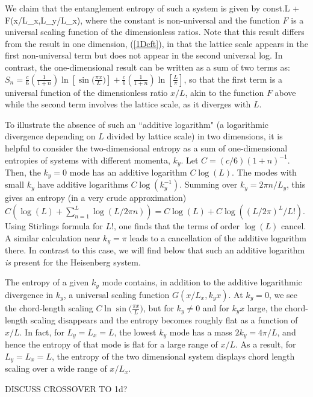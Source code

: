 \documentclass[prl,aps,twocolumn,floatfix,amsmath,amssymb,superscriptaddress,tightenlines]{revtex4}
\begin{document}
We claim that the entanglement entropy of such a system is given by
\be
{\rm const.}\times L + F(x/L_x,L_y/L_x),
\ee
where the constant is non-universal and the function $F$ is a universal scaling function of the dimensionless ratios.  Note that this result differs
from the result in one dimension, (\ref{1Dcft}), in that the lattice scale appears in the first non-universal term but does not appear in the second universal log.  In contrast, the one-dimensional result can be written as a sum of two terms as:
$S_n = \frac{c}{6}\left({ \frac{1}{1+n} }\right) \ln[\sin\big( \frac{\pi x}{L} \big)]+\frac{c}{6}\left(\frac{1}{1+n}\right)\ln[\frac{L}{\pi}]$, so that the first term is a universal function of the dimensionless ratio $x/L$, akin to the function $F$ above while the second term involves the lattice scale, as it diverges with $L$.

To illustrate the absence of such an ``additive logarithm" (a logarithmic divergence depending on $L$ divided by lattice scale) in two dimensions, it is helpful to 
consider the two-dimensional entropy as a sum of one-dimensional entropies of systems with different momenta, $k_y$.  Let $C=(c/6)(1+n)^{-1}$.  Then, the $k_y=0$ mode has an additive logarithm $C \log(L)$.  The modes with small $k_y$ have additive logarithms $C \log(k_y^{-1})$.  Summing over $k_y=2\pi n/L_y$, this gives an entropy (in a very crude approximation) $C (\log(L)+\sum_{n=1}^{L} \log(L/2 \pi n))=C\log(L) + C\log((L/2\pi)^L/L!)$.  Using Stirlings formula for $L!$, one finds that the terms of order $\log(L)$ cancel.  A similar calculation near $k_y=\pi$ leads to a cancellation of the additive logarithm there.
In contrast to this case, we will find below that such an additive logarithm {\it is} present for the Heisenberg system.

The entropy of a given $k_y$ mode contains, in addition to the additive logarithmic divergence in $k_y$, a universal scaling function $G(x/L_x,k_y x)$.  At $k_y=0$, we see the chord-length scaling $C \ln\sin\big( \frac{\pi x}{L} \big)$, but for $k_y \neq 0$ and for $k_y x$ large, the chord-length scaling disappears and the entropy becomes roughly flat as a function of $x/L$.  In fact, for $L_y=L_x=L$, the lowest $k_y$ mode has a mass $2 k_y=4\pi/L$, and hence the entropy of that mode is flat for a large range of $x/L$.  As a result, for $L_y=L_x=L$, the entropy of the two dimensional system displays chord length scaling over a wide range of $x/L_x$.

DISCUSS CROSSOVER TO 1d?
\end{document}
